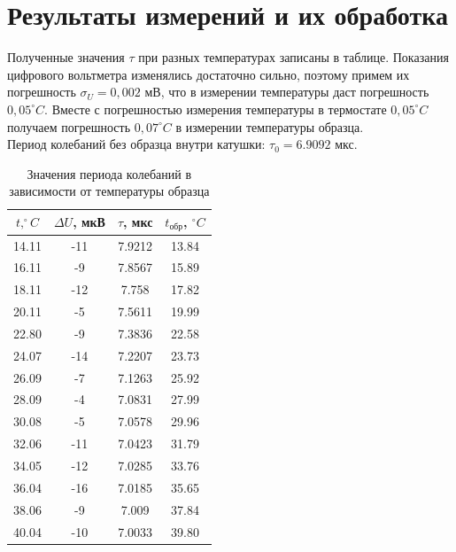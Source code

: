 \documentclass[a4paper, 12pt]{article}
\begin{document}
\section* {Результаты измерений и их обработка}
Полученные значения $\tau$ при разных температурах записаны в таблице. Показания цифрового вольтметра изменялись достаточно сильно, поэтому примем их погрешность $\sigma_U = 0,002$ мВ, что в измерении температуры даст погрешность $0,05^{\circ} C$. Вместе с погрешностью измерения температуры в термостате $0,05^{\circ} C$ получаем погрешность $0,07^{\circ} C$ в измерении температуры образца.\\
Период колебаний без образца внутри катушки: $\tau_0 = 6.9092$ мкс.

\begin{table}[h!]
    \centering
    \begin{tabular}{|c|c|c|c|}
        \hline
        $t, ^{\circ}C$ & $\Delta U$, мкВ & $\tau$, мкс & $t_{\text{обр}}$, $^{\circ}C$ \\ \hline
		14.11 &	-11 &	7.9212  & 13.84 \\\hline
		16.11 &	-9 &	7.8567  & 15.89 \\\hline
		18.11 &	-12 &	7.758   & 17.82 \\\hline
		20.11 &	-5 &	7.5611  & 19.99 \\\hline
		22.80 &	-9 &	7.3836  & 22.58 \\\hline
		24.07 &	-14 &	7.2207  & 23.73 \\\hline
		26.09 &	-7 &	7.1263  & 25.92 \\\hline
		28.09 &	-4 &	7.0831  & 27.99 \\\hline
		30.08 &	-5 &	7.0578  & 29.96 \\\hline
		32.06 &	-11 &	7.0423  & 31.79 \\\hline
		34.05 &	-12 &	7.0285  & 33.76 \\\hline
		36.04 &	-16 &	7.0185  & 35.65 \\\hline
		38.06 &	-9 &	7.009   & 37.84 \\\hline
		40.04 &	-10 &	7.0033  & 39.80 \\\hline
    \end{tabular}
    \caption{Значения периода колебаний в зависимости от температуры образца}
\end{table}
\end{document}
